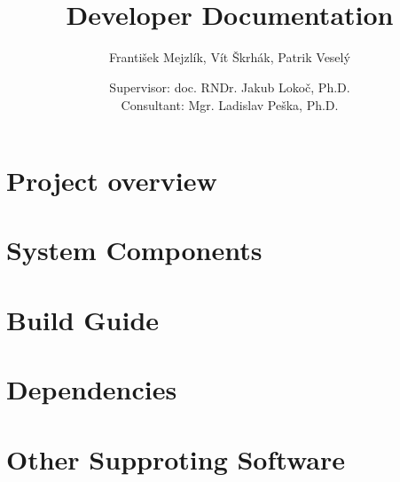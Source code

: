 \documentclass[10pt,a4paper]{report}
\title{\textcool{\bf SOMHunter Video Search Tool} \\ Developer Documentation}
\author{František Mejzlík, Vít Škrhák, Patrik Veselý}
\date{Supervisor: doc. RNDr. Jakub Lokoč, Ph.D. \\ \vspace{5mm} Consultant: Mgr. Ladislav Peška, Ph.D.}
\begin{document}
\maketitle

\tableofcontents




\part{Project overview}



\part{System Components}






\part{Build Guide}


\part{Dependencies}


\part{Other Supproting Software}




 


\printindex
\begin{appendices}

\end{appendices}
\end{document}
